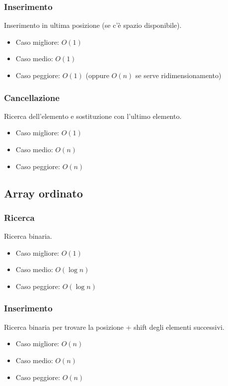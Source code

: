 \documentclass[a4paper,12pt]{article}
\begin{document}
\subsubsection{Inserimento}
Inserimento in ultima posizione (se c’è spazio disponibile).
\begin{itemize}
    \item Caso migliore: $O(1)$
    \item Caso medio: $O(1)$
    \item Caso peggiore: $O(1)$ (oppure $O(n)$ se serve ridimensionamento)
\end{itemize}

\subsubsection{Cancellazione}
Ricerca dell’elemento e sostituzione con l’ultimo elemento.
\begin{itemize}
    \item Caso migliore: $O(1)$
    \item Caso medio: $O(n)$
    \item Caso peggiore: $O(n)$
\end{itemize}


\subsection{Array ordinato}

\subsubsection{Ricerca}
Ricerca binaria.
\begin{itemize}
    \item Caso migliore: $O(1)$
    \item Caso medio: $O(\log n)$
    \item Caso peggiore: $O(\log n)$
\end{itemize}

\subsubsection{Inserimento}
Ricerca binaria per trovare la posizione + shift degli elementi successivi.
\begin{itemize}
    \item Caso migliore: $O(n)$
    \item Caso medio: $O(n)$
    \item Caso peggiore: $O(n)$
\end{itemize}
\end{document}
